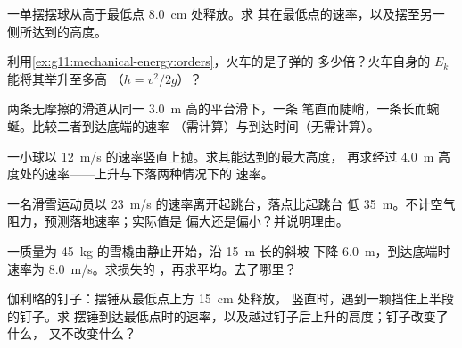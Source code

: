 \begin{exercise}[$\star$]\label{exo:g11:mechanical-energy:5}
一单摆摆球从高于最低点 \qty{8.0}{cm} 处释放。求
其在最低点的速率，以及摆至另一侧所达到的高度。
\end{exercise}

\begin{exercise}[$\star\star$]\label{exo:g11:mechanical-energy:6}
利用\cref{ex:g11:mechanical-energy:orders}，火车的是子弹的
多少倍？火车自身的 $E_k$ 能将其举升至多高
（$h = v^2/2g$）？
\end{exercise}

\begin{exercise}[$\star\star$]\label{exo:g11:mechanical-energy:7}
两条无摩擦的滑道从同一 \qty{3.0}{m} 高的平台滑下，一条
笔直而陡峭，一条长而蜿蜒。比较二者到达底端的速率
（需计算）与到达时间（无需计算）。
\end{exercise}

\begin{exercise}[$\star\star$]\label{exo:g11:mechanical-energy:8}
一小球以 \qty{12}{m/s} 的速率竖直上抛。求其能达到的最大高度，
再求经过 \qty{4.0}{m} 高度处的速率——上升与下落两种情况下的
速率。
\end{exercise}

\begin{exercise}[$\star\star$]\label{exo:g11:mechanical-energy:9}
一名滑雪运动员以 \qty{23}{m/s} 的速率离开起跳台，落点比起跳台
低 \qty{35}{m}。不计空气阻力，预测落地速率；实际值是
偏大还是偏小？并说明理由。
\end{exercise}

\begin{exercise}[$\star\star$]\label{exo:g11:mechanical-energy:10}
一质量为 \qty{45}{kg} 的雪橇由静止开始，沿 \qty{15}{m} 长的斜坡
下降 \qty{6.0}{m}，到达底端时速率为 \qty{8.0}{m/s}。求损失的
，再求平均。去了哪里？
\end{exercise}

\begin{exercise}[$\star\star$]\label{exo:g11:mechanical-energy:11}
伽利略的钉子：摆锤从最低点上方 \qty{15}{cm} 处释放，
竖直时，遇到一颗挡住上半段的钉子。求
摆锤到达最低点时的速率，以及越过钉子后上升的高度；钉子改变了什么，
又不改变什么？
\end{exercise}

